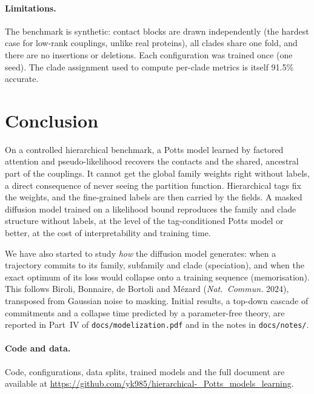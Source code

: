 \documentclass[10pt,a4paper,twocolumn]{article}
\begin{document}
\paragraph{Limitations.} The benchmark is synthetic: contact blocks are drawn independently (the hardest case for
low-rank couplings, unlike real proteins), all clades share one fold, and there are no insertions or deletions. Each
configuration was trained once (one seed). The clade assignment used to compute per-clade metrics is itself 91.5\%
accurate.

\section{Conclusion}
On a controlled hierarchical benchmark, a Potts model learned by factored attention and pseudo-likelihood recovers the
contacts and the shared, ancestral part of the couplings. It cannot get the global family weights right without
labels, a direct consequence of never seeing the partition function. Hierarchical tags fix the weights, and the
fine-grained labels are then carried by the fields. A masked diffusion model trained on a likelihood bound reproduces
the family and clade structure without labels, at the level of the tag-conditioned Potts model or better, at the cost
of interpretability and training time.

We have also started to study \emph{how} the diffusion model generates: when a trajectory commits to its family,
subfamily and clade (speciation), and when the exact optimum of its loss would collapse onto a training sequence
(memorisation). This follows Biroli, Bonnaire, de Bortoli and Mézard (\emph{Nat.\ Commun.} 2024), transposed from
Gaussian noise to masking. Initial results, a top-down cascade of commitments and a collapse time predicted by a
parameter-free theory, are reported in Part~IV of \texttt{docs/modelization.pdf} and in the notes in
\texttt{docs/notes/}.

\paragraph{Code and data.} Code, configurations, data splits, trained models and the full document are available at
\url{https://github.com/yk985/hierarchical-_Potts_models_learning}.
\end{document}
